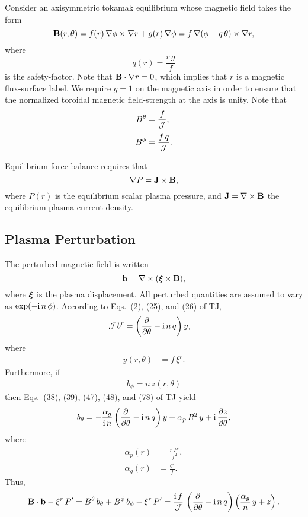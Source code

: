 \documentclass[12pt,prb,aps,notitlepage]{revtex4-1}
\newcommand{\bxi}{\mbox{\boldmath$\xi$}}
\begin{document}
Consider an axisymmetric tokamak equilibrium whose magnetic field takes the form
\begin{equation}
{\bf B}(r,\theta) = f(r)\,\nabla\phi\times \nabla r + g(r)\,\nabla\phi = f\,\nabla(\phi-q\,\theta)\times \nabla r,
\end{equation}
where
\begin{equation}\label{q}
q(r) = \frac{r\,g}{f}
\end{equation}
is the safety-factor. Note that ${\bf B}\cdot\nabla r=0$, which implies that $r$ is a magnetic flux-surface label.
We require $g=1$ on the magnetic axis in order to ensure that the normalized toroidal magnetic field-strength at the  axis is unity.  
Note that 
\begin{align}
B^\theta&= \frac{f}{\cal J},\\[0.5ex]
B^\phi &=\frac{f\,q}{\cal J}.
\end{align}

Equilibrium force balance requires that
\begin{equation}\label{e15c}
 \nabla P={\bf J}\times {\bf B},
\end{equation}
where $P(r)$ is the equilibrium scalar plasma pressure, and ${\bf J}=\nabla\times {\bf B}$ the equilibrium plasma current density. 

\subsection{Plasma Perturbation}
The perturbed magnetic field is written 
\begin{equation}
{\bf b} = \nabla\times (\bxi\times{\bf B}),
\end{equation}
where $\bxi$ is the plasma displacement. All perturbed quantities are assumed to vary as $\exp(-{\rm i}\,n\,\phi)$. According to Eqs.~(2), (25), and (26) of TJ, 
\begin{align}
{\cal J}\,b^r&=\left(\frac{\partial}{\partial\theta}-{\rm i}\,n\,q\right)y,
\end{align}
where
\begin{align}\label{e10}
y(r,\theta)&= f\,\xi^r.
\end{align}
Furthermore, if
\begin{align}
b_\phi = n\,z(r,\theta)
\end{align}
then Eqs.~(38), (39), (47), (48), and (78) of TJ yield
\begin{align}
b_\theta = -\frac{\alpha_g}{{\rm i}\,n}\left(\frac{\partial}{\partial\theta} - {\rm i}\,n\,q\right)y +\alpha_p\,R^2\,y +{\rm i}\,\frac{\partial z}{\partial\theta},
\end{align}
where
\begin{align}
\alpha_p(r) &= \frac{r\,P'}{f^2},\label{ap}\\[0.5ex]
\alpha_g (r)&= \frac{g'}{f}.\label{ag}
\end{align}
Thus,
\begin{equation}\label{e15}
{\bf B}\cdot{\bf b} -\xi^r\,P' = B^\theta\,b_\theta+B^\phi\,b_\phi - \xi^r\,P'=
\frac{{\rm i}\,f}{\cal J}\,\left(\frac{\partial}{\partial\theta}- {\rm i}\,n\,q\right)\left(\frac{\alpha_g}{n}\,y+z\right).
\end{equation}
\end{document}
